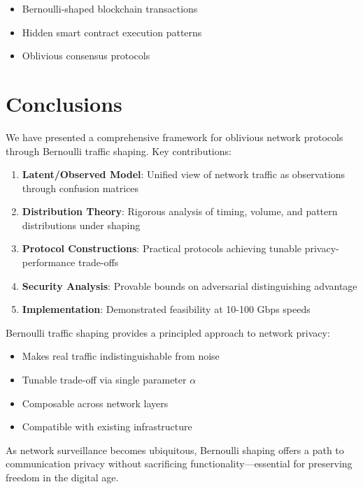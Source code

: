 \documentclass[11pt,final]{article}
\begin{document}
\begin{itemize}
    \item Bernoulli-shaped blockchain transactions
    \item Hidden smart contract execution patterns
    \item Oblivious consensus protocols
\end{itemize}

\section{Conclusions}

We have presented a comprehensive framework for oblivious network protocols through Bernoulli traffic shaping. Key contributions:

\begin{enumerate}
    \item \textbf{Latent/Observed Model}: Unified view of network traffic as observations through confusion matrices
    
    \item \textbf{Distribution Theory}: Rigorous analysis of timing, volume, and pattern distributions under shaping
    
    \item \textbf{Protocol Constructions}: Practical protocols achieving tunable privacy-performance trade-offs
    
    \item \textbf{Security Analysis}: Provable bounds on adversarial distinguishing advantage
    
    \item \textbf{Implementation}: Demonstrated feasibility at 10-100 Gbps speeds
\end{enumerate}

Bernoulli traffic shaping provides a principled approach to network privacy:
\begin{itemize}
    \item Makes real traffic indistinguishable from noise
    \item Tunable trade-off via single parameter $\alpha$
    \item Composable across network layers
    \item Compatible with existing infrastructure
\end{itemize}

As network surveillance becomes ubiquitous, Bernoulli shaping offers a path to communication privacy without sacrificing functionality—essential for preserving freedom in the digital age.


\end{document}
